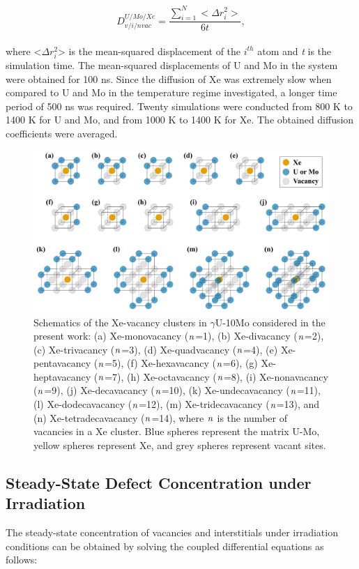 \documentclass[preprint,12pt]{elsarticle}
\begin{document}
\begin{equation}
\label{eq:surface1}
D_{v/i/nvac}^{U/Mo/Xe}=\frac{\sum_{i=1}^{N}{<\Delta r_{i}^{2}>}}{6t},
\end{equation}
\\
\noindent where <$\Delta r_{i}^{2}$> is the mean-squared displacement of the $\textit{i}^{th}$ atom and \textit{t} is the simulation time. The mean-squared displacements of U and Mo in the system were obtained for 100 ns. Since the diffusion of Xe was extremely slow when compared to U and Mo in the temperature regime investigated, a longer time period of 500 ns was required. Twenty simulations were conducted from 800 K to 1400 K for U and Mo, and from 1000 K to 1400 K for Xe. The obtained diffusion coefficients were averaged.
\\
\begin{figure}[hbt!]
\centering
\includegraphics[width=1.0\textwidth]{Fig1.png}
\caption{Schematics of the Xe-vacancy clusters in $\gamma$U-10Mo considered in the present work: (a) Xe-monovacancy ($\it{n}$=1), (b) Xe-divacancy ($\it{n}$=2), (c) Xe-trivacancy ($\it{n}$=3), (d) Xe-quadvacancy ($\it{n}$=4), (e) Xe-pentavacancy ($\it{n}$=5), (f) Xe-hexavacancy ($\it{n}$=6), (g) Xe-heptavacancy ($\it{n}$=7), (h) Xe-octavacancy ($\it{n}$=8), (i) Xe-nonavacancy ($\it{n}$=9), (j) Xe-decavacancy ($\it{n}$=10), (k) Xe-undecavacancy ($\it{n}$=11), (l) Xe-dodecavacancy ($\it{n}$=12), (m) Xe-tridecavacancy ($\it{n}$=13), and (n) Xe-tetradecavacancy ($\it{n}$=14), where $\it{n}$ is the number of vacancies in a Xe cluster. Blue spheres represent the matrix U-Mo, yellow spheres represent Xe, and grey spheres represent vacant sites. }
\label{fig:xeclusters}
\end{figure}

\subsection{Steady-State Defect Concentration under Irradiation}
The steady-state concentration of vacancies and interstitials under irradiation conditions can be obtained by solving the coupled differential equations as follows:
\end{document}
